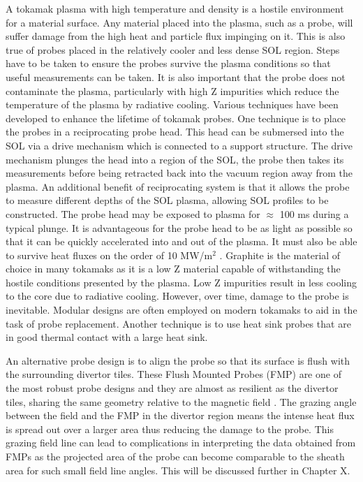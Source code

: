 A tokamak plasma with high temperature and density is a hostile environment for a material surface. Any material placed into the plasma, such as a probe, will suffer damage from the high heat and particle flux impinging on it. This is also true of probes placed in the relatively cooler and less dense SOL region. Steps have to be taken to ensure the probes survive the plasma conditions so that useful measurements can be taken. It is also important that the probe does not contaminate the plasma, particularly with high Z impurities which reduce the temperature of the plasma by radiative cooling. Various techniques have been developed to enhance the lifetime of tokamak probes. One technique is to place the probes in a reciprocating probe head. This head can be submersed into the SOL via a drive mechanism which is connected to a support structure. The drive mechanism plunges the head into a region of the SOL, the probe then takes its measurements before being retracted back into the vacuum region away from the plasma. An additional benefit of reciprocating system is that it allows the probe to measure different depths of the SOL plasma, allowing SOL profiles to be constructed. The probe head may be exposed to plasma for $\approx$ 100 ms during a typical plunge. It is advantageous for the probe head to be as light as possible so that it can be quickly accelerated into and out of the plasma. It must also be able to survive heat fluxes on the order of 10 MW/m$^2$ \cite{first_wall}. Graphite is the material of choice in many tokamaks as it is a low Z material capable of withstanding the hostile conditions presented by the plasma. Low Z impurities result in less cooling to the core due to radiative cooling. However, over time, damage to the probe is inevitable. Modular designs are often employed on modern tokamaks to aid in the task of probe replacement. Another technique is to use heat sink probes that are in good thermal contact with a large heat sink.

An alternative probe design is to align the probe so that its surface is flush with the surrounding divertor tiles. These Flush Mounted Probes (FMP) are one of the most robust probe designs and they are almost as resilient as the divertor tiles, sharing the same geometry relative to the magnetic field \cite{FMP-intro}. The grazing angle between the field and the FMP in the divertor region means the intense heat flux is spread out over a larger area thus reducing the damage to the probe. This grazing field line can lead to complications in interpreting the data obtained from FMPs as the projected area of the probe can become comparable to the sheath area for such small field line angles. This will be discussed further in Chapter X.


